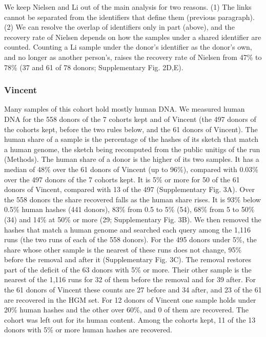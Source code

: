 \documentclass[11pt,a4paper]{article}
\begin{document}
We keep Nielsen and Li out of the main analysis for two reasons. (1) The links cannot be separated from the identifiers that define them (previous paragraph). (2) We can resolve the overlap of identifiers only in part (above), and the recovery rate of Nielsen depends on how the samples under a shared identifier are counted. Counting a Li sample under the donor's identifier as the donor's own, and no longer as another person's, raises the recovery rate of Nielsen from 47\% to 78\% (37 and 61 of 78 donors; Supplementary Fig. 2D,E).

\subsubsection*{Vincent}

Many samples of this cohort hold mostly human DNA. We measured human DNA for the 558 donors of the 7 cohorts kept and of Vincent (the 497 donors of the cohorts kept, before the two rules below, and the 61 donors of Vincent). The human share of a sample is the percentage of the hashes of its sketch that match a human genome, the sketch being recomputed from the public unitigs of the run (Methods). The human share of a donor is the higher of its two samples. It has a median of 48\% over the 61 donors of Vincent (up to 96\%), compared with 0.03\% over the 497 donors of the 7 cohorts kept. It is 5\% or more for 50 of the 61 donors of Vincent, compared with 13 of the 497 (Supplementary Fig. 3A). Over the 558 donors the share recovered falls as the human share rises. It is 93\% below 0.5\% human hashes (441 donors), 83\% from 0.5 to 5\% (54), 68\% from 5 to 50\% (34) and 14\% at 50\% or more (29; Supplementary Fig. 3B). We then removed the hashes that match a human genome and searched each query among the 1,116 runs (the two runs of each of the 558 donors). For the 495 donors under 5\%, the share whose other sample is the nearest of these runs does not change, 95\% before the removal and after it (Supplementary Fig. 3C). The removal restores part of the deficit of the 63 donors with 5\% or more. Their other sample is the nearest of the 1,116 runs for 32 of them before the removal and for 39 after. For the 61 donors of Vincent these counts are 27 before and 34 after, and 23 of the 61 are recovered in the HGM set. For 12 donors of Vincent one sample holds under 20\% human hashes and the other over 60\%, and 0 of them are recovered. The cohort was left out for its human content. Among the cohorts kept, 11 of the 13 donors with 5\% or more human hashes are recovered.
\end{document}
